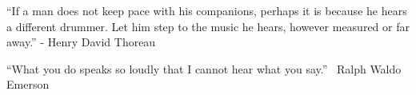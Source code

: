  “If a man does not keep pace with his companions, perhaps it is because he hears a different drummer. Let him step to the music he hears, however measured or far away.” - Henry David Thoreau











“What you do speaks so loudly that I cannot hear what you say.” ~Ralph Waldo Emerson

